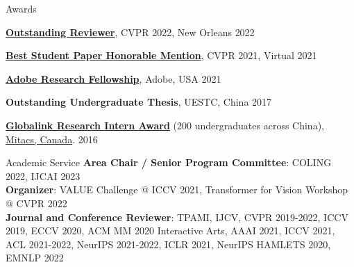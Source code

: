 \documentclass{resume} %
\begin{document}
\begin{rSection}{Awards}
\item {\textbf{\href{https://cvpr2022.thecvf.com/outstanding-reviewers}{Outstanding Reviewer}}, CVPR 2022, New Orleans } \hfill {2022}        
\item {\textbf{\href{http://cvpr2021.thecvf.com/node/329}{Best Student Paper Honorable Mention}}, CVPR 2021, Virtual } \hfill {2021}    
\item {\textbf{\href{https://research.adobe.com/fellowship/}{Adobe Research Fellowship}}, Adobe, USA} \hfill {2021}    
\item {\textbf{Outstanding Undergraduate Thesis}, UESTC, China} \hfill {2017} 
\item {\textbf{\href{https://www.mitacs.ca/en/programs/globalink/globalink-research-internship}{Globalink Research Intern Award}} (200 undergraduates across China), \href{https://www.mitacs.ca/en}{Mitacs, Canada}. } \hfill {2016}
\end{rSection}


\newpage



\begin{rSection}{Academic Service}
    \textbf{Area Chair / Senior Program Committee}: COLING 2022, IJCAI 2023  \\
    \textbf{Organizer}:  VALUE Challenge @ ICCV 2021, Transformer for Vision Workshop @ CVPR 2022 \\
    \textbf{Journal and Conference Reviewer}: TPAMI, IJCV, CVPR 2019-2022, ICCV 2019, ECCV 2020, ACM MM 2020 Interactive Arts, AAAI 2021, ICCV 2021, ACL 2021-2022, NeurIPS 2021-2022, ICLR 2021, NeurIPS HAMLETS 2020, EMNLP 2022
\end{rSection}



    
\end{document}
